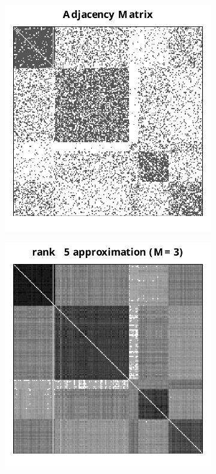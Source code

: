 \documentclass[10pt,letterpaper]{article}
\begin{document}
\begin{figure}
\begin{subfigure}{.4\textwidth}
  \includegraphics[width=\linewidth]{SBM_A.pdf}
\end{subfigure}
\begin{subfigure}{.4\textwidth}
  \centering
  \includegraphics[width=\linewidth]{SBM_Phat.pdf}

\end{subfigure}
\end{figure}
\end{document}
